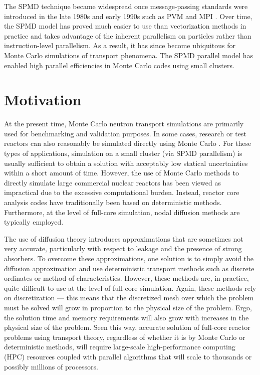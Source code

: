 The SPMD technique became widespread once message-passing standards were
introduced in the late 1980s and early 1990s such as PVM
\cite{ornl-beguelin-1991} and MPI \cite{gropp-1999}. Over time, the SPMD model
has proved much easier to use than vectorization methods in practice and takes
advantage of the inherent parallelism on particles rather than instruction-level
parallelism. As a result, it has since become ubiquitous for Monte Carlo
simulations of transport phenomena. The SPMD parallel model has enabled high
parallel efficiencies in Monte Carlo codes using small clusters.

\section{Motivation}

At the present time, Monte Carlo neutron transport simulations are primarily
used for benchmarking and validation purposes. In some cases, research or test
reactors can also reasonably be simulated directly using Monte Carlo
\cite{anfm-romano-2009}. For these types of applications, simulation on a small
cluster (via SPMD parallelism) is usually sufficient to obtain a solution with
acceptably low statical uncertainties within a short amount of time. However,
the use of Monte Carlo methods to directly simulate large commercial nuclear
reactors has been viewed as impractical due to the excessive computational
burden. Instead, reactor core analysis codes have traditionally been based on
deterministic methods. Furthermore, at the level of full-core simulation, nodal
diffusion methods are typically employed.

The use of diffusion theory introduces approximations that are sometimes not
very accurate, particularly with respect to leakage and the presence of strong
absorbers. To overcome these approximations, one solution is to simply avoid the
diffusion approximation and use deterministic transport methods such as discrete
ordinates or method of characteristics. However, these methods are, in practice,
quite difficult to use at the level of full-core simulation. Again, these
methods rely on discretization --- this means that the discretized mesh over
which the problem must be solved will grow in proportion to the physical size of
the problem. Ergo, the solution time and memory requirements will also grow with
increases in the physical size of the problem. Seen this way, accurate solution
of full-core reactor problems using transport theory, regardless of whether it
is by Monte Carlo or deterministic methods, will require large-scale
high-performance computing (HPC) resources coupled with parallel algorithms that
will scale to thousands or possibly millions of processors.

